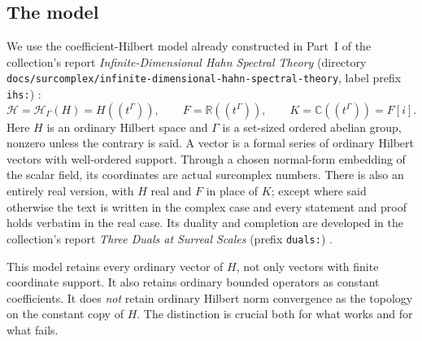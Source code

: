 \documentclass[11pt,letterpaper]{article}
\numberwithin{equation}{section}
\theoremstyle{definition}
\theoremstyle{remark}
\newcommand{\R}{\mathbb R}
\newcommand{\C}{\mathbb C}
\newcommand{\F}{F}
\newcommand{\K}{K}
\newcommand{\HH}[1]{\mathscr H_\Gamma(#1)}
\newcommand{\cH}{\mathcal H}
\newcommand{\replabel}[1]{\nolinkurl{#1}}
\newcommand{\fn}[1]{\nolinkurl{#1}}
\begin{document}
\subsection{The model}\label{hgeo:sub:model}
We use the coefficient-Hilbert model already constructed in Part~I of the
collection's report \emph{Infinite-Dimensional Hahn Spectral Theory}
(directory \fn{docs/surcomplex/infinite-dimensional-hahn-spectral-theory},
label prefix \replabel{ihs:}) \cite{RepoSpectral}:
\[
 \cH=\HH{H}=H((t^\Gamma)),\qquad
 \F=\R((t^\Gamma)),\qquad \K=\C((t^\Gamma))=\F[i].
\]
Here $H$ is an ordinary Hilbert space and $\Gamma$ is a set-sized ordered
abelian group, nonzero unless the contrary is said. A vector is a formal
series of ordinary Hilbert vectors with well-ordered support. Through a
chosen normal-form embedding of the scalar field, its coordinates are actual
surcomplex numbers. There is also an entirely real version, with $H$ real
and $\F$ in place of $\K$; except where said otherwise the text is written
in the complex case and every statement and proof holds verbatim in the
real case. Its duality and completion are developed in the collection's
report \emph{Three Duals at Surreal Scales} (prefix \replabel{duals:})
\cite{RepoDuals}.

This model retains every ordinary vector of $H$, not only vectors with
finite coordinate support. It also retains ordinary bounded operators
as constant coefficients. It does \emph{not} retain ordinary Hilbert
norm convergence as the topology on the constant copy of $H$.
The distinction is crucial both for what works and for what fails.
\end{document}

